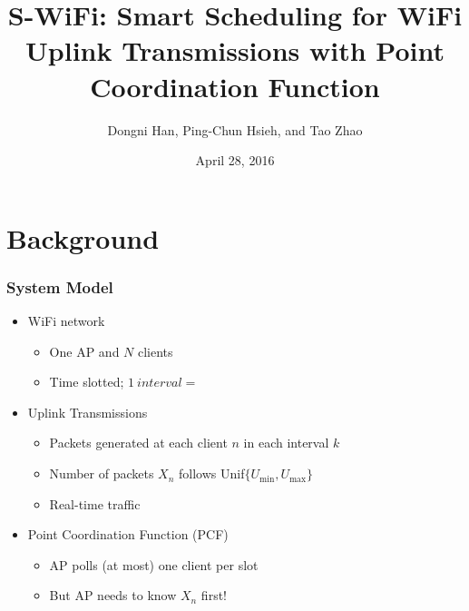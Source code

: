 \documentclass{beamer}
\begin{document}
\title{S-WiFi: Smart Scheduling for WiFi Uplink Transmissions with Point Coordination Function}
\author{Dongni Han, Ping-Chun Hsieh, and Tao Zhao}
\date{April 28, 2016}
\newtheorem{thm}{Theorem}
\begin{frame}
\titlepage
\end{frame}





\section{Background}

\begin{frame}
\frametitle{System Model}
\begin{itemize}
  \item WiFi network
    \begin{itemize}
      \item One AP and $N$ clients
      \item Time slotted; $\SI{1}{interval} =$ 
    \end{itemize}
  \item Uplink Transmissions
    \begin{itemize}
      \item Packets generated at each client $n$ in each interval $k$
      \item Number of packets $X_n$ follows Unif$\{U_\text{min}, U_\text{max}\}$
      \item Real-time traffic
    \end{itemize}
  \item Point Coordination Function (PCF)
    \begin{itemize}
      \item AP polls (at most) one client per slot
      \item But AP needs to know $X_n$ first!
    \end{itemize}
\end{itemize}
\end{frame}
\end{document}
